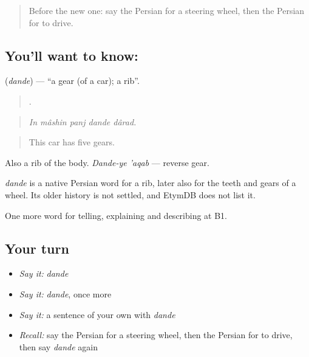 \label{lesson:FA-C420-dande}



\begin{quote}
Before the new one: say the Persian for a steering wheel, then the Persian for to drive.
\end{quote}

\subsection*{You'll want to know: }
\textbf{} (\emph{dande}) — \textquotedblleft{}a gear (of a car); a rib\textquotedblright{}.

\begin{quote}
    .
\end{quote}

\begin{quote}
\emph{In mâshin panj dande dârad.}
\end{quote}

\begin{quote}
This car has five gears.
\end{quote}

Also a rib of the body. \emph{Dande-ye 'aqab} — reverse gear.

\begin{cousinweb}
\emph{dande} is a native Persian word for a rib, later also for the teeth and gears of a wheel. Its older history is not settled, and EtymDB does not list it.
\end{cousinweb}

\begin{grammarlens}[title={What you've built}]
One more word for telling, explaining and describing at B1.
\end{grammarlens}

\subsection*{Your turn}
\begin{itemize}
\raggedright
  \item \emph{Say it:} \emph{dande}
  \item \emph{Say it:} \emph{dande}, once more
  \item \emph{Say it:} a sentence of your own with \emph{dande}
  \item \emph{Recall:} say the Persian for a steering wheel, then the Persian for to drive, then say \emph{dande} again
\end{itemize}

